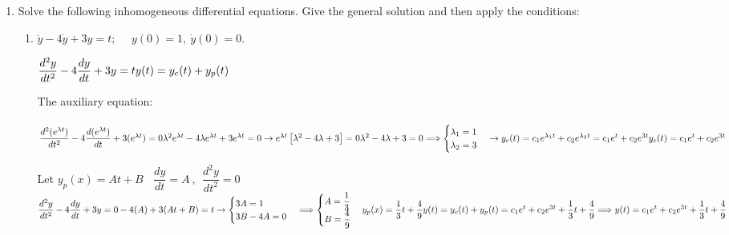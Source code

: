 \documentclass[fleqn]{article}
\begin{document}
\begin{enumerate}
    \item Solve the following inhomogeneous differential equations. Give the general solution and then apply the conditions:

      \begin{enumerate}
        \item $\ddot y-4 \dot y+3y=t; ~~~~~~ y(0)=1, ~ \dot y(0)=0.$

          \textcolor{hwColor}{
            $
              \dfrac{d^2 y}{dt^2}-4\dfrac{dy}{dt}+3y=t \\
              \\
              y(t)=y_c(t)+y_p(t) \\
            $
          }

          \textcolor{hwColor}{
            The auxiliary equation: \\
            \\
            $
              \dfrac{d^2 (e^{\lambda t})}{dt^2}-4\dfrac{d(e^{\lambda t})}{dt}+3(e^{\lambda t})=0 \\
              \\
              \lambda^2 e^{\lambda t}-4\lambda e^{\lambda t}+3e^{\lambda t}=0 \rightarrow e^{\lambda t} \left[\lambda^2-4\lambda+3\right]=0 \\
              \\
              \lambda^2-4\lambda+3=0 \Longrightarrow \begin{cases}
                \lambda_1=1 \\
                \lambda_2=3
              \end{cases} \rightarrow 
              y_c(t)=c_1e^{\lambda_1 t}+c_2e^{\lambda_2 t}=c_1e^t+c_2e^{3t} \\
              \\
              y_c(t)=c_1e^t+c_2e^{3t}
            $
          }

          \bigbreak

          \textcolor{hwColor}{
            Let $y_p(x)=At+B ~~~~ \dfrac{dy}{dt}=A~, ~~ \dfrac{d^2 y}{dt^2}=0$ \\
            $
              \dfrac{d^2 y}{dt^2}-4\dfrac{dy}{dt}+3y=0-4(A)+3(At+B)=t \rightarrow \begin{cases}
                3A=1   \\
                3B-4A=0  
              \end{cases} \Longrightarrow \begin{cases}
                A=\dfrac{1}{3} \\
                B=\dfrac{4}{9}
              \end{cases} \\
              \\
              y_p(x)=\dfrac{1}{3}t+\dfrac{4}{9} \\
              \\
              y(t)=y_c(t)+y_p(t)=c_1e^t+c_2e^{3t}+\dfrac{1}{3}t+\dfrac{4}{9} \\
              \\
              \\
              \Longrightarrow y(t)=c_1e^t+c_2e^{3t}+\dfrac{1}{3}t+\dfrac{4}{9}
            $
          }


\end{enumerate}
\end{enumerate}
\end{document}

